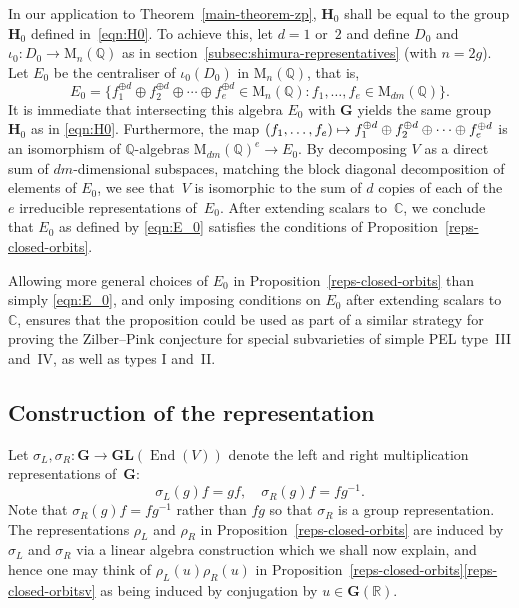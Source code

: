 \documentclass[JEP,XML,SOM,Unicode,NoFloatCountersInSection]{cedram}
\def\mto{\mathchoice{\longmapsto}{\mapsto}{\mapsto}{\mapsto}}
\newcommand{\bC}{\mathbb{C}}
\newcommand{\bQ}{\mathbb{Q}}
\newcommand{\bR}{\mathbb{R}}
\newcommand{\gG}{\mathbf{G}}
\newcommand{\gGL}{\mathbf{GL}}
\newcommand{\gH}{\mathbf{H}}
\newcommand{\rM}{\mathrm{M}}
\DeclareMathOperator{\End}{End}
\begin{document}
In our application to Theorem~\ref{main-theorem-zp}, $\gH_0$ shall be equal to the group $\gH_0$ defined in~\eqref{eqn:H0}.
To achieve this, let $d=1$ or~$2$ and define $D_0$ and $\iota_0 \colon D_0 \to \rM_n(\bQ)$ as in section~\ref{subsec:shimura-representatives} (with $n=2g$).
Let $E_0$ be the centraliser of $\iota_0(D_0)$ in $\rM_n(\bQ)$, that is,
\begin{equation} \label{eqn:E_0}
E_0 = \{ f_1^{\oplus d} \oplus f_2^{\oplus d} \oplus \dotsb \oplus f_e^{\oplus d} \in \rM_n(\bQ) :
f_1, \dotsc, f_e \in \rM_{dm}(\bQ) \}.
\end{equation}
It is immediate that intersecting this algebra $E_0$ with $\gG$ yields the same group $\gH_0$ as in \eqref{eqn:H0}.
Furthermore, the map $(f_1, \dotsc, f_e) \mto f_1^{\oplus d} \oplus f_2^{\oplus d} \oplus \dotsb \oplus f_e^{\oplus d}$ is an isomorphism of $\bQ$-algebras $\rM_{dm}(\bQ)^e \to E_0$.
By decomposing $V$ as a direct sum of $dm$-dimensional subspaces, matching the block diagonal decomposition of elements of $E_0$, we see that~$V$ is isomorphic to the sum of $d$ copies of each of the $e$ irreducible representations of~$E_0$.
After extending scalars to~$\bC$, we conclude that $E_0$ as defined by \eqref{eqn:E_0} satisfies the conditions of Proposition~\ref{reps-closed-orbits}.

Allowing more general choices of $E_0$ in Proposition~\ref{reps-closed-orbits} than simply \eqref{eqn:E_0}, and only imposing conditions on $E_0$ after extending scalars to~$\bC$, ensures that the proposition could be used as part of a similar strategy for proving the Zilber--Pink conjecture for special subvarieties of simple PEL type~III and~IV, as well as types I and~II.

\subsection{Construction of the representation}

Let $\sigma_L, \sigma_R \colon \gG \to \gGL(\End(V))$ denote the left and right multiplication representations of~$\gG$:
\begin{equation*}
\sigma_L(g)f = gf, \quad \sigma_R(g)f = fg^{-1}.
\end{equation*}
Note that $\sigma_R(g)f = fg^{-1}$ rather than $fg$ so that $\sigma_R$ is a group representation.
The representations $\rho_L$ and $\rho_R$ in Proposition~\ref{reps-closed-orbits} are induced by $\sigma_L$ and $\sigma_R$ via a linear algebra construction which we shall now explain, and hence one may think of $\rho_L(u)\rho_R(u)$ in Proposition~\ref{reps-closed-orbits}\eqref{reps-closed-orbitsv} as being induced by conjugation by $u \in \gG(\bR)$.
\end{document}
